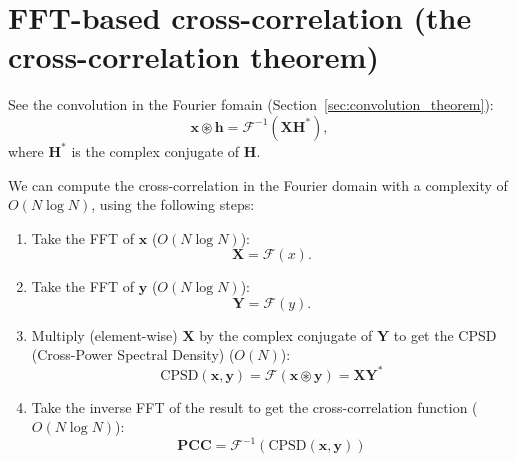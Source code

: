 

\section{FFT-based cross-correlation (the cross-correlation theorem)}

See the convolution in the Fourier fomain (Section~\ref{sec:convolution_theorem}):
\begin{equation}
  \mathbf{x}\circledast\mathbf{h} = \mathcal{F}^{-1}(\mathbf{X}\mathbf{H}^*),
  \label{eq:FFT_CC}
\end{equation}
where $\mathbf{H}^*$ is the complex conjugate of $\mathbf{H}$.

We can compute the cross-correlation in the Fourier
domain with a
complexity of $O(N\log N)$, using the following steps:
\begin{enumerate}
\item Take the FFT of $\mathbf{x}$ ($O(N\log N)$):
  \begin{equation}
    \mathbf{X} = \mathcal{F}(x).
  \end{equation}
\item Take the FFT of $\mathbf{y}$ ($O(N\log N)$):
  \begin{equation}
    \mathbf{Y} = \mathcal{F}(y).
  \end{equation}
\item Multiply (element-wise) $\mathbf{X}$ by the complex conjugate of
  $\mathbf{Y}$ to get the CPSD (Cross-Power Spectral Density) ($O(N)$):
  \begin{equation}
    \text{CPSD}(\mathbf{x},\mathbf{y})=\mathcal{F}(\mathbf{x}\circledast\mathbf{y})=\mathbf{X}\mathbf{Y}^*
  \end{equation}
\item Take the inverse FFT of the result to get the cross-correlation
  function ($O(N\log N)$):
  \begin{equation}
    \mathbf{PCC} = \mathcal{F}^{-1}(\text{CPSD}(\mathbf{x},\mathbf{y}))
  \end{equation}
\end{enumerate}

